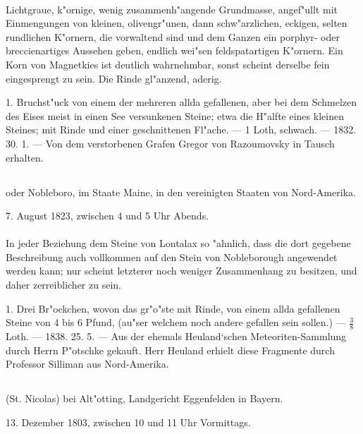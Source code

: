 \documentclass[a4paper, 11pt, oneside, polutonikogreek, german]{article}
\begin{document}
\paragraph{}
Lichtgraue, k"ornige, wenig zusammenh"angende Grundmasse, angef"ullt mit Einmengungen von kleinen, olivengr"unen, dann schw"arzlichen, eckigen, selten rundlichen K"ornern, die vorwaltend sind und dem Ganzen ein porphyr- oder breccienartiges Aussehen geben, endlich wei"sen feldspatartigen K"ornern. Ein Korn von Magnetkies ist deutlich wahrnehmbar, sonst scheint derselbe fein eingesprengt zu sein. Die Rinde gl"anzend, aderig.

1. Bruchst"uck von einem der mehreren allda gefallenen, aber bei dem Schmelzen des Eises meist in einen See versunkenen Steine; etwa die H"alfte eines kleinen Steines; mit Rinde und einer geschnittenen Fl"ache. --- 1 Loth, schwach. --- 1832. 30. 1. --- Von dem verstorbenen Grafen Gregor von Razoumovsky in Tausch erhalten.
\subsection[\frakfamily{Nobleborough.}]{}
\begin{center}

oder Nobleboro, im Staate Maine, in den vereinigten Staaten von Nord-Amerika.

7. August 1823, zwischen 4 und 5 Uhr Abends.
\end{center}
\paragraph{}
In jeder Beziehung dem Steine von Lontalax so "ahnlich, dass die dort gegebene Beschreibung auch vollkommen auf den Stein von Nobleborough angewendet werden kann; nur scheint letzterer noch weniger Zusammenhang zu besitzen, und daher zerreiblicher zu sein.

1. Drei Br"ockchen, wovon das gr"o"ste mit Rinde, von einem allda gefallenen Steine von 4 bis 6 Pfund, (au"ser welchem noch andere gefallen sein sollen.) --- $\frac{3}{8}$ Loth. --- 1838. 25. 5. --- Aus der ehemals Heuland‘schen Meteoriten-Sammlung durch Herrn P"otschke gekauft. Herr Heuland erhielt diese Fragmente durch Professor Silliman aus Nord-Amerika.
\subsection{}
\begin{center}

(St. Nicolas) bei Alt"otting, Landgericht Eggenfelden in Bayern.

13. Dezember 1803, zwischen 10 und 11 Uhr Vormittags.
\end{center}
\end{document}
